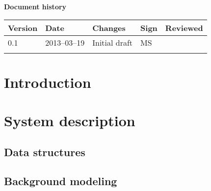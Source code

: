 \documentclass[10pt, a4paper, twoside]{article}
\numberwithin{equation}{section}
\numberwithin{figure}{section}
\begin{document}



\newpage
\pagestyle{fancy}
\setcounter{page}{2} %




\newpage
\tableofcontents
\listoffigures
\listoftables



\newpage
\vspace*{5\baselineskip}

\begin{center}
\textbf{\LARGE Document history}

{ \footnotesize 
\begin{tabular}{|p{1cm}|p{2.0cm}|p{5cm}|p{1.5cm}|p{1.5cm}|}
	\hline
	\textbf{Version} & \textbf{Date} & \textbf{Changes} & \textbf{Sign} & \textbf{Reviewed} \\
	
	\hline
	0.1 & 2013--03--19 & Initial draft & MS & \\
	
	\hline
	 &  &  &  &  \\
	
	\hline
\end{tabular}
}
\end{center}





%
%
\newpage
{}

\newpage
\section{Introduction}


\section{System description}


\newpage
\subsection{Data structures}


\newpage
\subsection{Background modeling}

\end{document}
